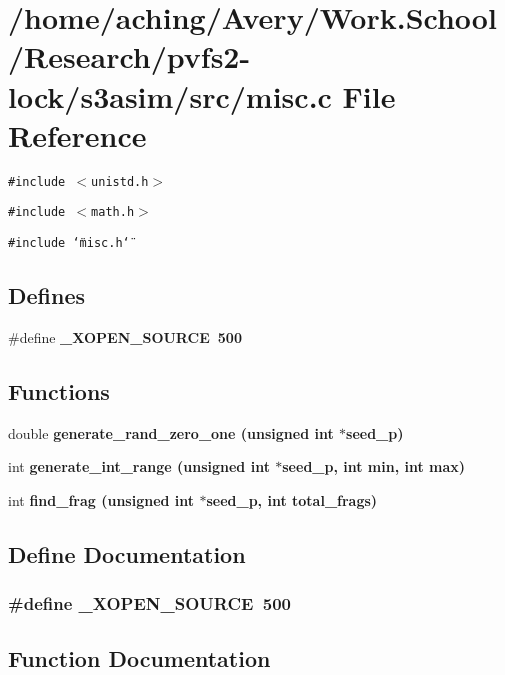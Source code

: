 \section{/home/aching/Avery/Work.School/Research/pvfs2-lock/s3asim/src/misc.c File Reference}
\label{misc_8c}
{\tt \#include $<$unistd.h$>$}\par
{\tt \#include $<$math.h$>$}\par
{\tt \#include \char`\"{}misc.h\char`\"{}}\par
\subsection*{Defines}
\begin{CompactItemize}
\item 
\#define \bf{\_\-XOPEN\_\-SOURCE}~500
\end{CompactItemize}
\subsection*{Functions}
\begin{CompactItemize}
\item 
double \bf{generate\_\-rand\_\-zero\_\-one} (unsigned int $\ast$seed\_\-p)
\item 
int \bf{generate\_\-int\_\-range} (unsigned int $\ast$seed\_\-p, int min, int max)
\item 
int \bf{find\_\-frag} (unsigned int $\ast$seed\_\-p, int total\_\-frags)
\end{CompactItemize}


\subsection{Define Documentation}
\subsubsection{\setlength{\rightskip}{0pt plus 5cm}\#define \_\-XOPEN\_\-SOURCE~500}\label{misc_8c_78c99ffd76a7bb3c8c74db76207e9ab4}




\subsection{Function Documentation}
